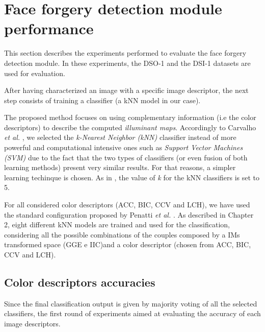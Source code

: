 \section{Face forgery detection module performance}

This section describes the experiments performed to evaluate the face forgery detection module. In these experiments, the DSO-1 and the DSI-1 datasets are used for evaluation.

After having characterized an image with a specific image descriptor, the next step consists of training a classifier (a kNN model in our case).

The proposed method focuses on using complementary information (i.e the color descriptors) to describe the computed \emph{illuminant maps}. Accordingly to Carvalho \emph{et al. }\cite{carvalho2016illuminant}, we selected the \emph{k-Nearest Neighbor (kNN)} classifier instead of more powerful and computational intensive ones such as \emph{Support Vector Machines (SVM)} due to the fact that the two types of classifiers (or even fusion of both learning methods) present very similar results. For that reasons, a simpler learning techinque is chosen\cite{carvalho2016illuminant}. As in \cite{carvalho2016illuminant}, the value of \emph{k} for the kNN classifiers is set to 5. 

For all considered color descriptors (ACC, BIC, CCV and LCH), we have used the standard configuration proposed by Penatti \emph{et al.} \cite{penatti2012comparative}. As described in Chapter 2, eight different kNN models are trained and used for the classification, considering all the possible combinations of the couples composed by a IMs transformed space (GGE e IIC)and a color descriptor (chosen from ACC, BIC, CCV and LCH).

\subsection{Color descriptors accuracies}

Since the final classification output is given by majority voting of all the selected classifiers, the first round of experiments aimed at evaluating the accuracy of each image descriptors.

